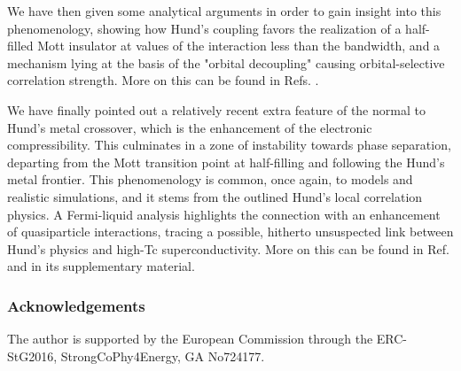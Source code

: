 \documentclass[12pt,twoside]{article}
\begin{document}
We have then given some analytical arguments in order to gain insight into this phenomenology, showing how Hund's coupling favors the realization of a half-filled Mott insulator at values of the interaction less than the bandwidth, and a mechanism lying at the basis of the "orbital decoupling" causing orbital-selective correlation strength. More on this can be found in Refs. \cite{georges_annrev,demedici_Vietri}.

We have finally pointed out a relatively recent extra feature of the normal to Hund's metal crossover, which is the enhancement of the electronic compressibility. This culminates in a zone of instability towards phase separation, departing from the Mott transition point at half-filling and following the Hund's metal frontier. This phenomenology is common, once again, to models and realistic simulations, and it stems from the outlined Hund's local correlation physics. A Fermi-liquid analysis highlights the connection with an enhancement of quasiparticle interactions, tracing a possible, hitherto unsuspected link between Hund's physics and high-Tc superconductivity. More on this can be found in Ref. \cite{demedici_compress} and in its supplementary material.

\vspace{1cm}
\subsubsection*{Acknowledgements}
The author is supported by the European Commission through the ERC-StG2016, StrongCoPhy4Energy, GA No724177.
\end{document}
